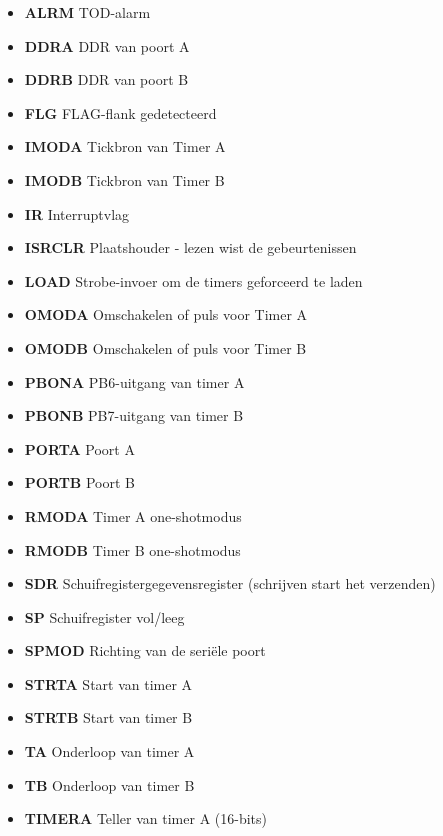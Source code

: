 \begin{itemize}
\item{\bf{ALRM}} TOD-alarm
\item{\bf{DDRA}} DDR van poort A
\item{\bf{DDRB}} DDR van poort B
\item{\bf{FLG}} FLAG-flank gedetecteerd
\item{\bf{IMODA}} Tickbron van Timer A
\item{\bf{IMODB}} Tickbron van Timer B
\item{\bf{IR}} Interruptvlag
\item{\bf{ISRCLR}} Plaatshouder - lezen wist de gebeurtenissen
\item{\bf{LOAD}} Strobe-invoer om de timers geforceerd te laden
\item{\bf{OMODA}} Omschakelen of puls voor Timer A
\item{\bf{OMODB}} Omschakelen of puls voor Timer B
\item{\bf{PBONA}} PB6-uitgang van timer A
\item{\bf{PBONB}} PB7-uitgang van timer B
\item{\bf{PORTA}} Poort A
\item{\bf{PORTB}} Poort B
\item{\bf{RMODA}} Timer A one-shotmodus
\item{\bf{RMODB}} Timer B one-shotmodus
\item{\bf{SDR}} Schuifregistergegevensregister (schrijven start het verzenden)
\item{\bf{SP}} Schuifregister vol/leeg
\item{\bf{SPMOD}} Richting van de seriële poort
\item{\bf{STRTA}} Start van timer A
\item{\bf{STRTB}} Start van timer B
\item{\bf{TA}} Onderloop van timer A
\item{\bf{TB}} Onderloop van timer B
\item{\bf{TIMERA}} Teller van timer A (16-bits)

\end{itemize}
